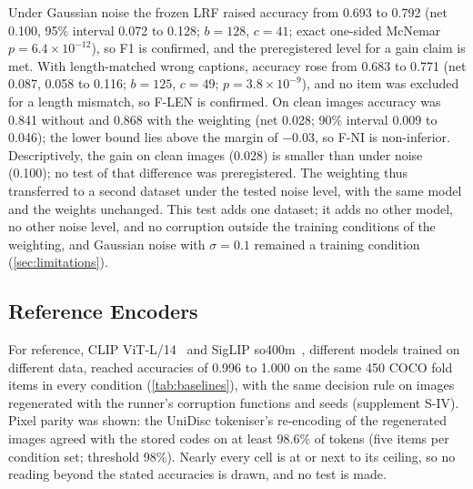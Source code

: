 Under Gaussian noise the frozen LRF raised accuracy from 0.693 to 0.792 (net 0.100, 95\% interval 0.072 to 0.128; $b=128$, $c=41$;
exact one-sided McNemar $p=6.4\times10^{-12}$), so F1 is confirmed, and the preregistered level for a gain claim is met.
With length-matched wrong captions, accuracy rose from 0.683 to 0.771 (net 0.087, 0.058 to 0.116; $b=125$, $c=49$; $p=3.8\times10^{-9}$), and no
item was excluded for a length mismatch, so F-LEN is confirmed.
On clean images accuracy was 0.841 without and 0.868 with the weighting (net 0.028; 90\% interval 0.009 to 0.046); the lower bound lies above
the margin of $-0.03$, so F-NI is non-inferior.
Descriptively, the gain on clean images (0.028) is smaller than under noise (0.100); no test of that difference was preregistered.
The weighting thus transferred to a second dataset under the tested noise level, with the same model and the weights unchanged.
This test adds one dataset; it adds no other model, no other noise level, and no corruption outside the training conditions of the
weighting, and Gaussian noise with $\sigma=0.1$ remained a training condition (\cref{sec:limitations}).

\subsection{Reference Encoders}\label{sec:study2-reference}
For reference, CLIP ViT-L/14~\cite{radford2021clip} and SigLIP so400m~\cite{zhai2023sigmoid}, different models trained on different data, reached accuracies of 0.996 to 1.000 on the
same 450 COCO fold items in every condition (\cref{tab:baselines}), with the same decision rule on images regenerated with the runner's corruption
functions and seeds (supplement S-IV).
Pixel parity was shown: the UniDisc tokeniser's re-encoding of the regenerated images agreed with the stored codes on at least 98.6\% of
tokens (five items per condition set; threshold 98\%).
Nearly every cell is at or next to its ceiling, so no reading beyond the stated accuracies is drawn, and no test is made.

